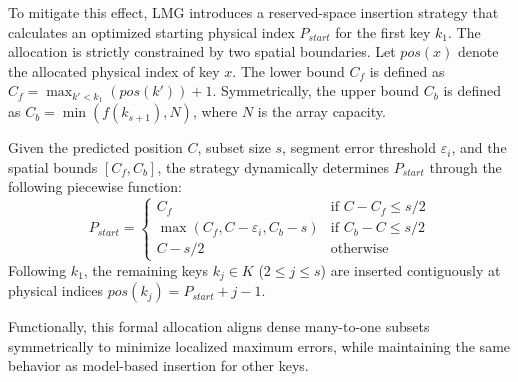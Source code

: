 To mitigate this effect, LMG introduces a reserved-space insertion strategy that calculates an optimized starting physical index $P_{start}$ for the first key $k_1$. The allocation is strictly constrained by two spatial boundaries. Let $pos(x)$ denote the allocated physical index of key $x$. The lower bound $C_f$ is defined as $C_f = \max_{k'<k_1} (pos(k')) + 1$. Symmetrically, the upper bound $C_b$ is defined as $C_b = \min(f(k_{s+1}), N)$, where $N$ is the array capacity.

Given the predicted position $C$, subset size $s$, segment error threshold $\varepsilon_i$, and the spatial bounds $[C_f, C_b]$, the strategy dynamically determines $P_{start}$ through the following piecewise function:
$$ P_{start} = \begin{cases}
C_f & \text{if } C - C_f \le s/2 \\
\max(C_f, C - \varepsilon_i, C_b - s) & \text{if } C_b - C \le s/2 \\
C - s/2 & \text{otherwise}
\end{cases} $$
Following $k_1$, the remaining keys $k_j \in K$ ($2 \le j \le s$) are inserted contiguously at physical indices $pos(k_j) = P_{start} + j - 1$.

Functionally, this formal allocation aligns dense many-to-one subsets symmetrically to minimize localized maximum errors, while maintaining the same behavior as model-based insertion for other keys.




